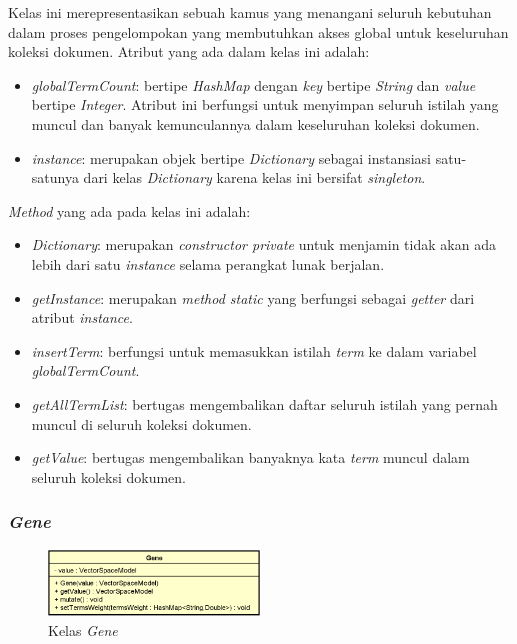 \documentclass[a4paper,twoside]{article}
\begin{document}
\begin{enumerate}
Kelas ini merepresentasikan sebuah kamus yang menangani seluruh kebutuhan dalam proses pengelompokan yang membutuhkan akses global untuk keseluruhan koleksi dokumen. Atribut yang ada dalam kelas ini adalah:

\begin{itemize}
	\item \textit{globalTermCount}: bertipe \textit{HashMap} dengan \textit{key} bertipe \textit{String} dan \textit{value} bertipe \textit{Integer}. Atribut ini berfungsi untuk menyimpan seluruh istilah yang muncul dan banyak kemunculannya dalam keseluruhan koleksi dokumen.
	\item \textit{instance}: merupakan objek bertipe \textit{Dictionary} sebagai instansiasi satu-satunya dari kelas \textit{Dictionary} karena kelas ini bersifat \textit{singleton}.
\end{itemize}

\textit{Method} yang ada pada kelas ini adalah:

\begin{itemize}
	\item \textit{Dictionary}: merupakan \textit{constructor private} untuk menjamin tidak akan ada lebih dari satu \textit{instance} selama perangkat lunak berjalan.
	\item \textit{getInstance}: merupakan \textit{method static} yang berfungsi sebagai \textit{getter} dari atribut \textit{instance}.
	\item \textit{insertTerm}: berfungsi untuk memasukkan istilah \textit{term} ke dalam variabel \textit{globalTermCount}.
	\item \textit{getAllTermList}: bertugas mengembalikan daftar seluruh istilah yang pernah muncul di seluruh koleksi dokumen.
	\item \textit{getValue}: bertugas mengembalikan banyaknya kata \textit{term} muncul dalam seluruh koleksi dokumen. 
\end{itemize}

\subsubsection*{\textit{Gene}}

\begin{figure}[h]
	\begin{center}
		\includegraphics[width=0.5\textwidth]{DiagramKelas/Gene}
		\caption{Kelas \textit{Gene}}
		\label{fig:kelasGene}
	\end{center}
\end{figure}


\end{enumerate}
\end{document}
